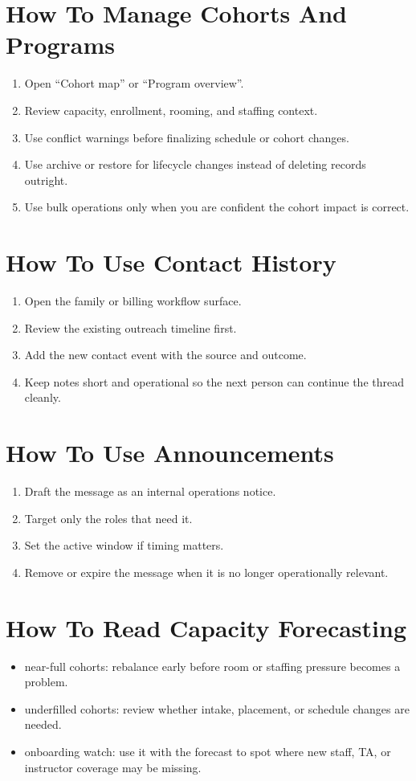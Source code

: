 \documentclass[11pt]{article}
\begin{document}
\section*{How To Manage Cohorts And Programs}
\begin{enumerate}
  \item Open ``Cohort map'' or ``Program overview''.
  \item Review capacity, enrollment, rooming, and staffing context.
  \item Use conflict warnings before finalizing schedule or cohort changes.
  \item Use archive or restore for lifecycle changes instead of deleting records outright.
  \item Use bulk operations only when you are confident the cohort impact is correct.
\end{enumerate}

\section*{How To Use Contact History}
\begin{enumerate}
  \item Open the family or billing workflow surface.
  \item Review the existing outreach timeline first.
  \item Add the new contact event with the source and outcome.
  \item Keep notes short and operational so the next person can continue the thread cleanly.
\end{enumerate}

\section*{How To Use Announcements}
\begin{enumerate}
  \item Draft the message as an internal operations notice.
  \item Target only the roles that need it.
  \item Set the active window if timing matters.
  \item Remove or expire the message when it is no longer operationally relevant.
\end{enumerate}

\section*{How To Read Capacity Forecasting}
\begin{itemize}
  \item near-full cohorts:
  rebalance early before room or staffing pressure becomes a problem.
  \item underfilled cohorts:
  review whether intake, placement, or schedule changes are needed.
  \item onboarding watch:
  use it with the forecast to spot where new staff, TA, or instructor coverage may be missing.
\end{itemize}
\end{document}
